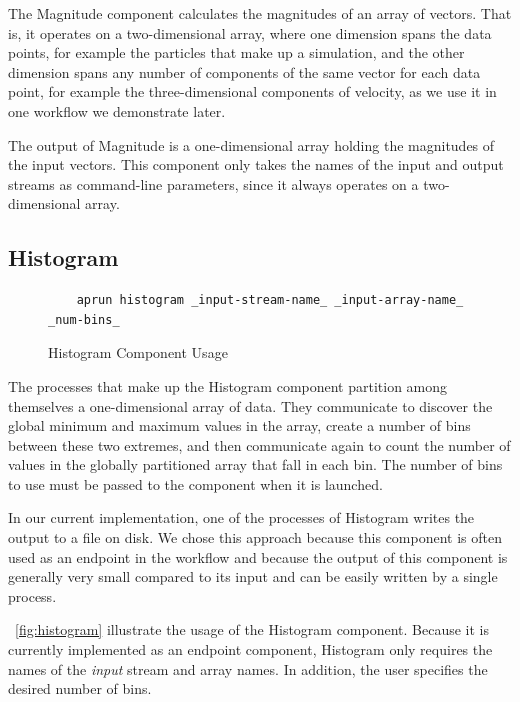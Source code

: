 The Magnitude component calculates the magnitudes
of an array of vectors. That is, it operates
on a two-dimensional array, where one dimension spans
the data points, for example the particles that
make up a simulation, and the other dimension spans any number
of components of the same vector for each data point, for example
the three-dimensional components of velocity,
as we use it in one workflow we demonstrate later.

The output of Magnitude is a one-dimensional array holding
the magnitudes of the input vectors. This \sys component
only takes the names of the input and output streams
as command-line parameters, since it always
operates on a two-dimensional array.

\subsection{Histogram}

\begin{figure}
  \begin{lstlisting}
    aprun histogram _input-stream-name_ _input-array-name_ _num-bins_
  \end{lstlisting}
  \vspace{-0.05in}
  \caption{Histogram Component Usage}
  \label{fig:histogram}
  \vspace{-0.05in}
\end{figure}

The processes that make up the Histogram component
partition among themselves a one-dimensional
array of data. They communicate to discover the global
minimum and maximum values in the array, create a
number of bins between these two extremes, and
then communicate again to count the number of values in the
globally partitioned array that fall in each bin.
The number of bins to use must be passed to the
component when it is launched.

In our current implementation, one of the processes
of Histogram writes the
output to a file on disk. We chose this approach
because this component is often used as an
endpoint in the workflow and because the output of this
component is generally very small compared to its input
and can be easily written by a single process.

~\autoref{fig:histogram} illustrate the usage of
the Histogram component. Because it is currently
implemented as an endpoint component, Histogram
only requires the names of the \textit{input}
stream and array names. In addition, the user
specifies the desired number of bins.

